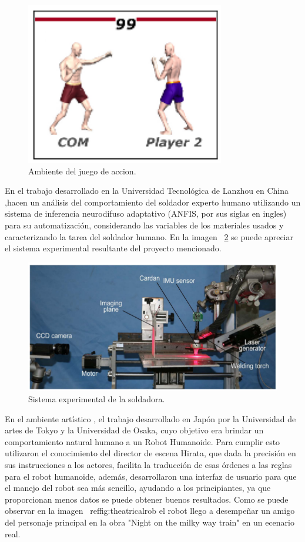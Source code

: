 \begin{figure}[H]
\centering
\includegraphics[width=0.5\columnwidth]{CapituloI/Imagenes/Imitating.png}
\caption{Ambiente del juego de accion.}
\label{fig:imitat}
\end{figure}


En el trabajo desarrollado en la Universidad Tecnológica de Lanzhou en China
 \cite{Zhang2017},hacen un análisis del comportamiento del soldador experto
 humano utilizando un sistema de inferencia neurodifuso adaptativo (ANFIS,
 por sus siglas en ingles) para su automatización, considerando las variables
 de los materiales usados y caracterizando la tarea del soldador humano.
 En la imagen ~\ref{fig:syswelding} se puede apreciar el sistema experimental resultante del proyecto mencionado.


\begin{figure}[H]
\centering
\includegraphics[width=0.8\columnwidth]{CapituloI/Imagenes/Welding.png}
\caption{Sistema experimental de la soldadora.}
\label{fig:syswelding}
\end{figure} 
 

En el ambiente artístico \cite{Nishiguchi2017}, el trabajo desarrollado en
 Japón por la Universidad de artes de Tokyo y la Universidad de Osaka, cuyo
 objetivo era brindar un comportamiento natural humano a un Robot Humanoide.
 Para cumplir esto utilizaron el conocimiento del director de escena Hirata,
 que dada la precisión en sus instrucciones a los actores, facilita la
 traducción de esas órdenes a las reglas para el robot humanoide, además,
 desarrollaron una interfaz de usuario para que el manejo del robot sea más
 sencillo, ayudando a los principiantes, ya que proporcionan menos datos se
 puede obtener buenos resultados. Como se puede observar en la imagen
 ~ref{fig:theatricalrob} el robot llego a desempeñar un amigo del
 personaje principal en la obra "Night on the milky way train" en un ecenario
 real.


